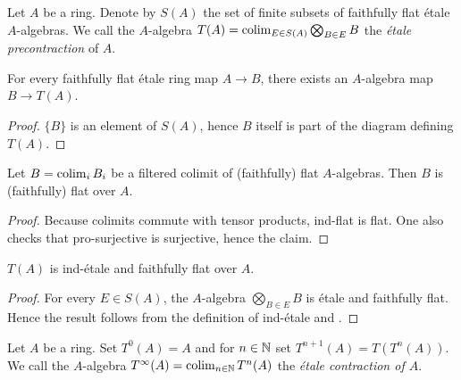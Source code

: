 \begin{definition}
    Let $A$ be a ring. Denote by $S(A)$ the set of finite subsets of faithfully flat étale $A$-algebras.
    We call the $A$-algebra $T(A) = \operatorname{colim}_{E \in S(A)} \bigotimes_{B \in E} B$ the \emph{étale precontraction} of
    $A$.
    \label{def:etale-precontraction}
\end{definition}

\begin{lemma}
    \label{lemma:etale-precontraction-semi-retraction}
    For every faithfully flat étale ring map $A \to B$, there exists an $A$-algebra map $B \to T(A)$.
\end{lemma}

\begin{proof}
    $\{B\}$ is an element of $S(A)$, hence $B$ itself is part of the diagram defining $T(A)$.
\end{proof}

\begin{lemma}
    Let $B = \operatorname{colim}_i B_i$ be a filtered colimit of (faithfully) flat $A$-algebras. Then
    $B$ is (faithfully) flat over $A$.
    \label{lemma:ind-faithfully-flat}
\end{lemma}

\begin{proof}
    Because colimits commute with tensor products, ind-flat is flat. One also checks
    that pro-surjective is surjective, hence the claim.
\end{proof}

\begin{lemma}
    $T(A)$ is ind-étale and faithfully flat over $A$.
    \label{lemma:etale-precontraction-ind-etale}
\end{lemma}

\begin{proof}
    For every $E \in S(A)$, the $A$-algebra $\bigotimes_{B \in E} B$ is étale and faithfully flat. Hence
    the result follows from the definition of ind-étale and .
\end{proof}

\begin{definition}
    Let $A$ be a ring. Set $T^0(A) = A$ and for $n \in \mathbb{N}$ set $T^{n+1}(A) = T(T^n(A))$.
    We call the $A$-algebra $T^{\infty}(A) = \operatorname{colim}_{n \in \mathbb{N}} T^n(A)$
    the \emph{étale contraction of $A$}.
    \label{def:etale-contraction}
\end{definition}

